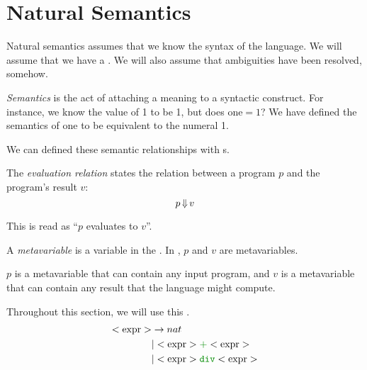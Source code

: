 \section{Natural Semantics}\label{sec:Natural_Semantics}
Natural semantics assumes that we know the syntax of the language.
We will assume that we have a  .
We will also assume that ambiguities have been resolved, somehow.

\begin{definition}[Semantics]\label{def:Semantics}
  \emph{Semantics} is the act of attaching a meaning to a syntactic construct.
  For instance, we know the value of 1 to be 1, but does $\text{one} = 1$?
  We have defined the semantics of $\text{one}$ to be equivalent to the numeral 1.

  We can defined these semantic relationships with s.
\end{definition}

\begin{definition}\label{def:Evaluation_Relation}
  The \emph{evaluation relation} states the relation between a program $p$ and the program's result $v$:
  \begin{equation}\label{eq:Evaluation_Relation}
    p \operatorname{\Downarrow} v
  \end{equation}

  This is read as ``$p$ evaluates to $v$''.
\end{definition}

\begin{definition}[Metavariable]\label{def:Metavariable}
  A \emph{metavariable} is a variable in the .
  In , $p$ and $v$ are metavariables.
  
  $p$ is a metavariable that can contain any input program, and $v$ is a metavariable that can contain any result that the language might compute.
\end{definition}

\begin{blackbox}
  Throughout this section, we will use this  .
  \begin{equation}\label{eq:DivAdd_Grammar}
    \begin{aligned}
      \Nonterminal{expr} &\rightarrow nat \\
      &\vert \Nonterminal{expr} \textcolor{Green4}{\mathtt{+}} \Nonterminal{expr} \\
      &\vert \Nonterminal{expr} \textcolor{Green4}{\mathtt{div}} \Nonterminal{expr} \\
    \end{aligned}
  \end{equation}
\end{blackbox}

